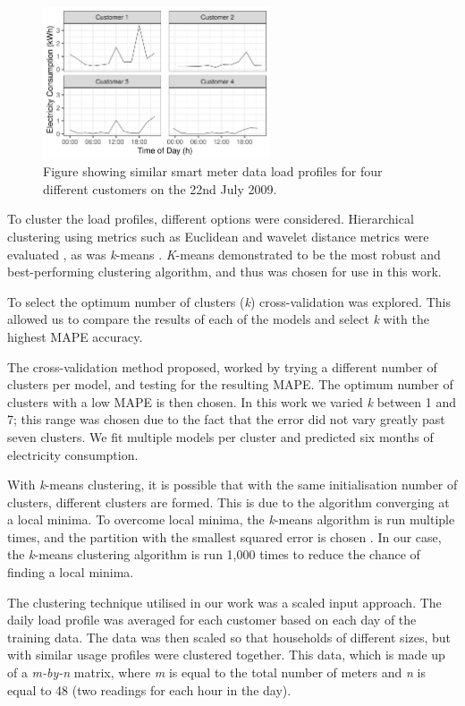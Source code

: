 \begin{figure}
	\centering
	\includegraphics[width=0.6\textwidth]{Chapter5/figures/short-term-forecasting/ebp_net-resizeimage-1.pdf}
	\caption{Figure showing similar smart meter data load profiles for four different customers on the 22nd July 2009.}
	\label{fig:similar_customers}
\end{figure}

To cluster the load profiles, different options were considered. Hierarchical clustering using metrics such as Euclidean and wavelet distance metrics were evaluated \cite{BIMJ:BIMJ4710240520}, as was \textit{k}-means \cite{forgy1965cluster}.\textit{ K}-means demonstrated to be the most robust and best-performing clustering algorithm, and thus was chosen for use in this work.

To select the optimum number of clusters (\textit{k}) cross-validation was explored. This allowed us to compare the results of each of the models and select \textit{k} with the highest MAPE accuracy.

The cross-validation method proposed, worked by trying a different number of clusters per model, and testing for the resulting MAPE. The optimum number of clusters with a low MAPE is then chosen. In this work we varied \textit{k} between 1 and 7; this range was chosen due to the fact that the error did not vary greatly past seven clusters. We fit multiple models per cluster and predicted six months of electricity consumption.

With \textit{k}-means clustering, it is possible that with the same initialisation number of clusters, different clusters are formed. This is due to the algorithm converging at a local minima. To overcome local minima, the \textit{k}-means algorithm is run multiple times, and the partition with the smallest squared error is chosen \cite{Jain2010}. In our case, the \textit{k}-means clustering algorithm is run 1,000 times to reduce the chance of finding a local minima. 

The clustering technique utilised in our work was a scaled input approach. The daily load profile was averaged for each customer based on each day of the training data. The data was then scaled so that households of different sizes, but with similar usage profiles were clustered together. This data, which is made up of a \textit{m-by-n} matrix, where \textit{m} is equal to the total number of meters and \textit{n} is equal to 48 (two readings for each hour in the day).

